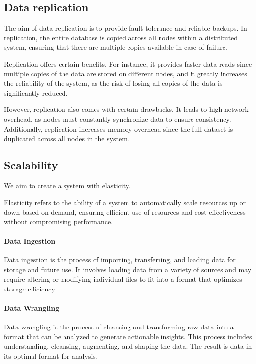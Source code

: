 \subsection{Data replication}
The aim of data replication is to provide fault-tolerance and reliable backups. 
In replication, the entire database is copied across all nodes within a distributed system, ensuring that there are multiple copies available in case of failure.

Replication offers certain benefits.
For instance, it provides faster data reads since multiple copies of the data are stored on different nodes, and it greatly increases the reliability of the system, as the risk of losing all copies of the data is significantly reduced.

However, replication also comes with certain drawbacks. 
It leads to high network overhead, as nodes must constantly synchronize data to ensure consistency. 
Additionally, replication increases memory overhead since the full dataset is duplicated across all nodes in the system.

\subsection{Scalability}
We aim to create a system with elasticity.
\begin{definition}
    Elasticity refers to the ability of a system to automatically scale resources up or down based on demand, ensuring efficient use of resources and cost-effectiveness without compromising performance.
\end{definition}

\paragraph*{Data Ingestion}
Data ingestion is the process of importing, transferring, and loading data for storage and future use. 
It involves loading data from a variety of sources and may require altering or modifying individual files to fit into a format that optimizes storage efficiency.

\paragraph*{Data Wrangling}
Data wrangling is the process of cleansing and transforming raw data into a format that can be analyzed to generate actionable insights. 
This process includes understanding, cleansing, augmenting, and shaping the data.
The result is data in its optimal format for analysis.